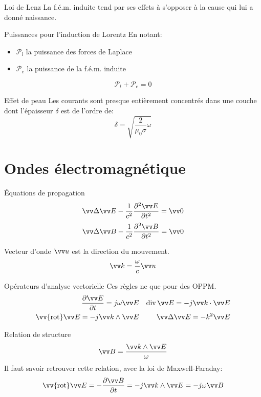 \documentclass[french, a4paper, 11pt, twocolumn]{article}
\DeclareMathOperator{\diverg}{div}        %
\newcommand{\rota}{\vv{\mathrm{rot}}}    %
\begin{document}
\begin{cadre}{Loi de Lenz}
  \og La f.é.m. induite tend par ses effets à s'opposer à la cause qui lui a donné naissance.\fg{}
\end{cadre}

\begin{cadre}{Puissances pour l'induction de Lorentz}
  En notant:
  \begin{itemize}
    \item \(\mathcal{P}_{l}\) la puissance des forces de Laplace
    \item \(\mathcal{P}_{e}\) la puissance de la f.é.m. induite
  \end{itemize}
  \[\mathcal{P}_{l}+\mathcal{P}_{e} = 0\]
\end{cadre}

\begin{cadre}{Effet de peau}
  Les courants sont presque entièrement concentrés dans une couche dont l'épaisseur \(\delta\) est de l'ordre de:
  \[\delta = \sqrt{\dfrac{2}{\mu_{0}\sigma}\omega}\]
\end{cadre}

\section{Ondes électromagnétique}
\begin{cadre}{Équations de propagation}
  \[\vv\Delta \vv E - \dfrac{1}{c^{2}}\dfrac{\partial^{2}\vv E}{\partial t^{2}} = \vv 0\]
  \[\vv\Delta \vv B - \dfrac{1}{c^{2}}\dfrac{\partial^{2}\vv B}{\partial t^{2}} = \vv 0\]
\end{cadre}

\begin{cadre}{Vecteur d'onde}
  \(\vv u\) est la direction du mouvement.
  \[\vv k = \dfrac{\omega}{c}\vv u\]
\end{cadre}

\begin{cadre}{Opérateurs d'analyse vectorielle}
  Ces règles ne que pour des OPPM.
  \begin{align*}
    \dfrac{\partial\vv E}{\partial t} = j\omega\vv E && \diverg\vv E = -j\vv k\cdot\vv E \\
    \rota\vv E = -j\vv k\wedge\vv E && \vv\Delta\vv E = -k^{2}\vv E
  \end{align*}
\end{cadre}

\begin{cadre}{Relation de structure}
  \[\vv B=\dfrac{\vv k\wedge\vv E}{\omega}\]
  Il faut savoir retrouver cette relation, avec la loi de Maxwell-Faraday:
  \[\rota\vv E = -\dfrac{\partial\vv B}{\partial t} = -j\vv k\wedge\vv E = -j\omega\vv B\]
\end{cadre}
\end{document}
